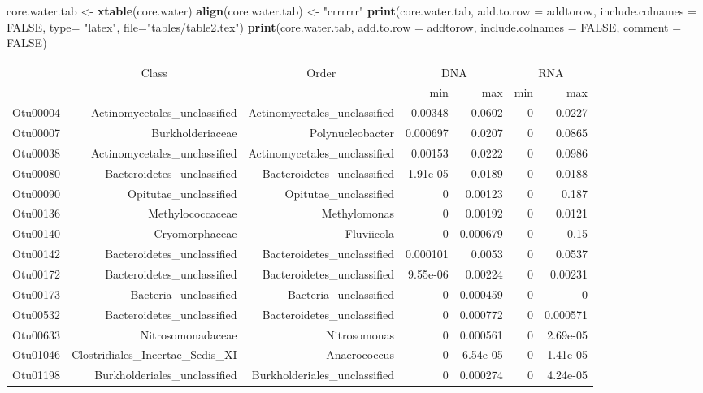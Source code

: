 \documentclass[]{article}
\newenvironment{Shaded}{\begin{snugshade}}{\end{snugshade}}
\newcommand{\KeywordTok}[1]{\textcolor[rgb]{0.13,0.29,0.53}{\textbf{#1}}}
\newcommand{\DataTypeTok}[1]{\textcolor[rgb]{0.13,0.29,0.53}{#1}}
\newcommand{\StringTok}[1]{\textcolor[rgb]{0.31,0.60,0.02}{#1}}
\newcommand{\OtherTok}[1]{\textcolor[rgb]{0.56,0.35,0.01}{#1}}
\newcommand{\NormalTok}[1]{#1}
\begin{document}
\begin{Shaded}
\begin{Highlighting}[]
\NormalTok{core.water.tab <-}\StringTok{ }\KeywordTok{xtable}\NormalTok{(core.water)}
\KeywordTok{align}\NormalTok{(core.water.tab) <-}\StringTok{ "crrrrrr"}
\KeywordTok{print}\NormalTok{(core.water.tab, }\DataTypeTok{add.to.row =}\NormalTok{ addtorow, }\DataTypeTok{include.colnames =} \OtherTok{FALSE}\NormalTok{, }
      \DataTypeTok{type=} \StringTok{"latex"}\NormalTok{, }\DataTypeTok{file=}\StringTok{"tables/table2.tex"}\NormalTok{)}
\KeywordTok{print}\NormalTok{(core.water.tab, }\DataTypeTok{add.to.row =}\NormalTok{ addtorow, }\DataTypeTok{include.colnames =} \OtherTok{FALSE}\NormalTok{, }\DataTypeTok{comment =} \OtherTok{FALSE}\NormalTok{)}
\end{Highlighting}
\end{Shaded}

\begin{table}[ht]
\centering
\begin{tabular}{crrrrrr}
  \hline
  & \multicolumn{1}{c}{Class} & \multicolumn{1}{c}{Order} & 
                      \multicolumn{2}{c}{DNA} & \multicolumn{2}{c}{RNA} \\
 & &  & min & max & min & max \\
 \hline
Otu00004 & Actinomycetales\_unclassified & Actinomycetales\_unclassified & 0.00348 & 0.0602 & 0 & 0.0227 \\ 
  Otu00007 & Burkholderiaceae & Polynucleobacter & 0.000697 & 0.0207 & 0 & 0.0865 \\ 
  Otu00038 & Actinomycetales\_unclassified & Actinomycetales\_unclassified & 0.00153 & 0.0222 & 0 & 0.0986 \\ 
  Otu00080 & Bacteroidetes\_unclassified & Bacteroidetes\_unclassified & 1.91e-05 & 0.0189 & 0 & 0.0188 \\ 
  Otu00090 & Opitutae\_unclassified & Opitutae\_unclassified & 0 & 0.00123 & 0 & 0.187 \\ 
  Otu00136 & Methylococcaceae & Methylomonas & 0 & 0.00192 & 0 & 0.0121 \\ 
  Otu00140 & Cryomorphaceae & Fluviicola & 0 & 0.000679 & 0 & 0.15 \\ 
  Otu00142 & Bacteroidetes\_unclassified & Bacteroidetes\_unclassified & 0.000101 & 0.0053 & 0 & 0.0537 \\ 
  Otu00172 & Bacteroidetes\_unclassified & Bacteroidetes\_unclassified & 9.55e-06 & 0.00224 & 0 & 0.00231 \\ 
  Otu00173 & Bacteria\_unclassified & Bacteria\_unclassified & 0 & 0.000459 & 0 & 0 \\ 
  Otu00532 & Bacteroidetes\_unclassified & Bacteroidetes\_unclassified & 0 & 0.000772 & 0 & 0.000571 \\ 
  Otu00633 & Nitrosomonadaceae & Nitrosomonas & 0 & 0.000561 & 0 & 2.69e-05 \\ 
  Otu01046 & Clostridiales\_Incertae\_Sedis\_XI & Anaerococcus & 0 & 6.54e-05 & 0 & 1.41e-05 \\ 
  Otu01198 & Burkholderiales\_unclassified & Burkholderiales\_unclassified & 0 & 0.000274 & 0 & 4.24e-05 \\ 
   \hline
\end{tabular}
\end{table}
\end{document}
